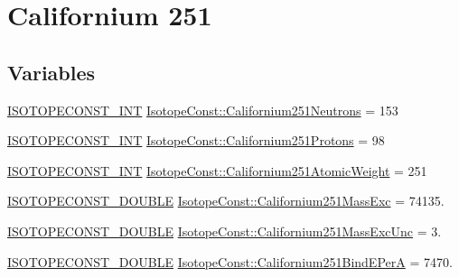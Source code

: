 \hypertarget{group___isotope_const-_californium-_cf251}{}\section{Californium 251}
\label{group___isotope_const-_californium-_cf251}
\subsection*{Variables}
\begin{DoxyCompactItemize}
\item 
\mbox{\hyperlink{group___isotope_const-_macros_ga5f18360b3e99483a35c32d789e62621c}{I\+S\+O\+T\+O\+P\+E\+C\+O\+N\+S\+T\+\_\+\+I\+NT}} \mbox{\hyperlink{group___isotope_const-_californium-_cf251_gaf7d9d9b26c9785733231336c4da67841}{Isotope\+Const\+::\+Californium251\+Neutrons}} = 153
\item 
\mbox{\hyperlink{group___isotope_const-_macros_ga5f18360b3e99483a35c32d789e62621c}{I\+S\+O\+T\+O\+P\+E\+C\+O\+N\+S\+T\+\_\+\+I\+NT}} \mbox{\hyperlink{group___isotope_const-_californium-_cf251_ga1c771f765d0150dd37f8a22efcb89552}{Isotope\+Const\+::\+Californium251\+Protons}} = 98
\item 
\mbox{\hyperlink{group___isotope_const-_macros_ga5f18360b3e99483a35c32d789e62621c}{I\+S\+O\+T\+O\+P\+E\+C\+O\+N\+S\+T\+\_\+\+I\+NT}} \mbox{\hyperlink{group___isotope_const-_californium-_cf251_ga9ec084bd276ef6b6fa8087bd12742413}{Isotope\+Const\+::\+Californium251\+Atomic\+Weight}} = 251
\item 
\mbox{\hyperlink{group___isotope_const-_macros_ga8f45a7272ce02c0b4c65c44636ed719a}{I\+S\+O\+T\+O\+P\+E\+C\+O\+N\+S\+T\+\_\+\+D\+O\+U\+B\+LE}} \mbox{\hyperlink{group___isotope_const-_californium-_cf251_gaf8d81e1e06719836a0232ada9048964a}{Isotope\+Const\+::\+Californium251\+Mass\+Exc}} = 74135.
\item 
\mbox{\hyperlink{group___isotope_const-_macros_ga8f45a7272ce02c0b4c65c44636ed719a}{I\+S\+O\+T\+O\+P\+E\+C\+O\+N\+S\+T\+\_\+\+D\+O\+U\+B\+LE}} \mbox{\hyperlink{group___isotope_const-_californium-_cf251_gacc3c061366ce06d54f7abbb8c8565ec4}{Isotope\+Const\+::\+Californium251\+Mass\+Exc\+Unc}} = 3.
\item 
\mbox{\hyperlink{group___isotope_const-_macros_ga8f45a7272ce02c0b4c65c44636ed719a}{I\+S\+O\+T\+O\+P\+E\+C\+O\+N\+S\+T\+\_\+\+D\+O\+U\+B\+LE}} \mbox{\hyperlink{group___isotope_const-_californium-_cf251_gacb6584b172f90f86c2f5a93f73a2ca49}{Isotope\+Const\+::\+Californium251\+Bind\+E\+PerA}} = 7470.

\end{DoxyCompactItemize}
